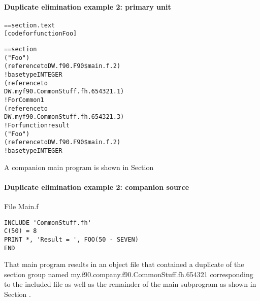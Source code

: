 \paragraph{Duplicate elimination example 2: primary unit }
\label{app:duplicateeliminationexample2primaryunit}
\begin{alltt}
== section .text
    [code for function Foo]

== section 
            ("Foo")
            (reference to DW.f90.F90\$main.f.2)
                ! base type INTEGER
                (reference to
                    DW.myf90.CommonStuff.fh.654321.1)
             ! For Common1
                (reference to
                    DW.myf90.CommonStuff.fh.654321.3)
             ! For function result
                ("Foo")
                    (reference to DW.f90.F90\$main.f.2)
                        ! base type INTEGER
\end{alltt}

A companion main program is shown in 
Section 

\paragraph{Duplicate elimination example 2: companion source }
\label{app:duplicateeliminationexample2companionsource}

File Main.f 

\begin{lstlisting}
INCLUDE 'CommonStuff.fh'
C(50) = 8
PRINT *, 'Result = ', FOO(50 - SEVEN)
END
\end{lstlisting}

That main program results in an object file that
contained a duplicate of the section group named
my.f90.company.f90.CommonStuff.fh.654321 
corresponding to the
included file as well as the remainder of the main subprogram
as shown in 
Section .

